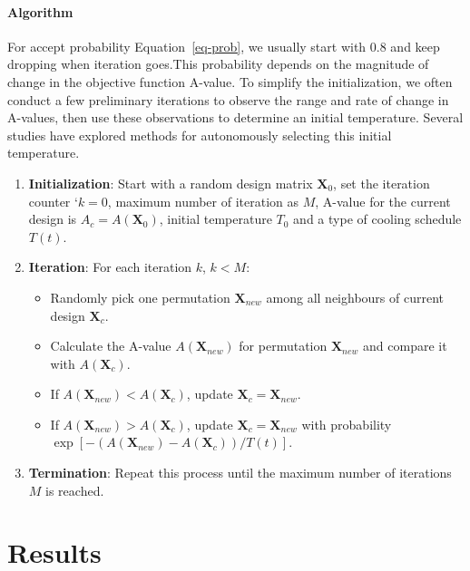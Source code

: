 \documentclass[
  a4paper,
  oneside,
  openany,
  12pt,
  onecolumn]{book}
\providecommand{\tightlist}{%
  \setlength{\itemsep}{0pt}\setlength{\parskip}{0pt}}\usepackage{longtable,booktabs,array}
\theoremstyle{definition}
\theoremstyle{definition}
\theoremstyle{plain}
\theoremstyle{remark}
\begin{document}
\subsubsection{Algorithm}\label{algorithm}

For accept probability Equation~\ref{eq-prob}, we usually start with
\(0.8\) and keep dropping when iteration goes.This probability depends
on the magnitude of change in the objective function A-value. To
simplify the initialization, we often conduct a few preliminary
iterations to observe the range and rate of change in A-values, then use
these observations to determine an initial temperature. Several studies
have explored methods for autonomously selecting this initial
temperature.

\begin{enumerate}
\def\labelenumi{\arabic{enumi}.}
\item
  \textbf{Initialization}: Start with a random design matrix
  \(\boldsymbol{X}_0\), set the iteration counter `\(k = 0\), maximum
  number of iteration as \(M\), A-value for the current design is
  \(A_c = A(\boldsymbol{X}_0)\), initial temperature \(T_0\) and a type
  of cooling schedule \(T(t)\).
\item
  \textbf{Iteration}: For each iteration \(k\), \(k<M\):

  \begin{itemize}
  \tightlist
  \item
    Randomly pick one permutation \(\boldsymbol{X}_{new}\) among all
    neighbours of current design \(\boldsymbol{X}_c\).
  \item
    Calculate the A-value \(A(\boldsymbol{X}_{new})\) for permutation
    \(\boldsymbol{X}_{new}\) and compare it with
    \(A(\boldsymbol{X}_c)\).
  \item
    If \(A(\boldsymbol{X}_{new}) < A(\boldsymbol{X}_c)\), update
    \(\boldsymbol{X}_c=\boldsymbol{X}_{new}\).
  \item
    If \(A(\boldsymbol{X}_{new}) > A(\boldsymbol{X}_c)\), update
    \(\boldsymbol{X}_c=\boldsymbol{X}_{new}\) with probability
    \(\exp[-(A(\boldsymbol{X}_{new}) - A(\boldsymbol{X}_c))/T(t)]\).
  \end{itemize}
\item
  \textbf{Termination}: Repeat this process until the maximum number of
  iterations \(M\) is reached.
\end{enumerate}


\chapter{Results}\label{sec-results}
\end{document}
